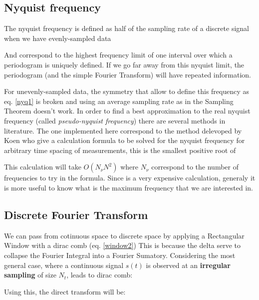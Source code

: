 \subsection{Nyquist frequency}{\label{subsec_nyqfreq}}
\newp The nyquist frequency is defined as half of the sampling rate  of a discrete signal when we have evenly-sampled data

\insertequation[\label{nyq1}]{\nu_N = 0.5 f_s}

\newp And correspond to the highest frequency limit of one interval over which a periodogram is uniquely defined. If we go far away from this nyquist limit, the periodogram (and the simple Fourier Transform) will have repeated information. 

\newp For unevenly-sampled data, the symmetry that allow to define this frequency as eq. \ref{nyq1} is broken and using an average sampling rate as in the Sampling Theorem doesn't work. In order to find a best approximation to the real nyquist frequency (called \textit{pseudo-nyquist frequency}) there are several methods in literature. The one implemented here correspond to the method delevoped by Koen \cite{koen-nyqFreq} who give a calculation formula to be solved for the nyquist frequency for arbitrary time spacing of measurements, this is the smallest positive root of


\newp This calculation will take $O(N_{\nu}N^2)$ where $N_{\nu}$ correspond to the number of frequencies to try in the formula. Since is a very expensive calculation, generaly it is more useful to know what is the maximum frequency that we are interested in.

\subsection{Discrete Fourier Transform}{\label{subsec_dft}}
\newp We can pass from cotinuous space to discrete space by applying a Rectangular Window with a dirac comb (eq. \ref{window2}) This is because the delta serve to collapse the Fourier Integral into a Fourier Sumatory. Considering the most general case, where a continuous signal $s(t)$ is observed at an \textbf{irregular sampling} of size $N_t$, leads to dirac comb:


\newp Using this, the direct transform will be:


